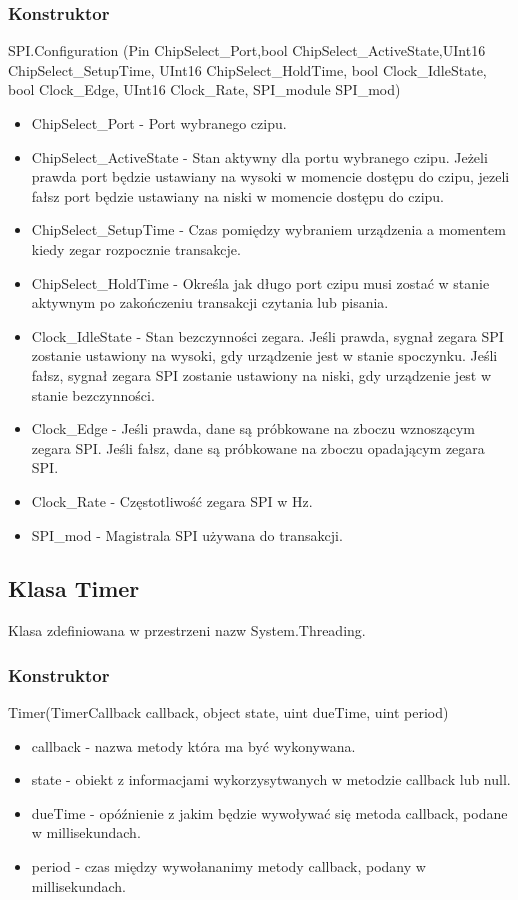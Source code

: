 \documentclass{article}
\begin{document}
\subsubsection{Konstruktor}
SPI.Configuration (Pin ChipSelect\_Port,bool ChipSelect\_ActiveState,\newline UInt16 ChipSelect\_SetupTime, UInt16 ChipSelect\_HoldTime,  bool Clock\_IdleState, bool Clock\_Edge, UInt16 Clock\_Rate, SPI\_module SPI\_mod)
\begin{itemize}
\item ChipSelect\_Port - Port wybranego czipu.
\item ChipSelect\_ActiveState - Stan aktywny dla portu wybranego czipu. Jeżeli prawda port będzie ustawiany na wysoki w momencie dostępu do czipu, jezeli fałsz port będzie ustawiany na niski w momencie dostępu do czipu.
\item ChipSelect\_SetupTime - Czas pomiędzy wybraniem urządzenia a momentem kiedy zegar rozpocznie transakcje. 
\item ChipSelect\_HoldTime - Określa jak długo port czipu musi zostać w stanie aktywnym po zakończeniu transakcji czytania lub pisania.
\item Clock\_IdleState - Stan bezczynności zegara. Jeśli prawda, sygnał zegara SPI zostanie ustawiony na wysoki, gdy urządzenie jest w stanie spoczynku. Jeśli fałsz, sygnał zegara SPI zostanie ustawiony na niski, gdy urządzenie jest w stanie bezczynności. 
\item Clock\_Edge - Jeśli prawda, dane są próbkowane na zboczu wznoszącym zegara SPI. Jeśli fałsz, dane są próbkowane na zboczu opadającym zegara SPI.
\item Clock\_Rate - Częstotliwość zegara SPI w Hz.
\item SPI\_mod - Magistrala SPI używana do transakcji.
\end{itemize}

\newpage
\subsection{Klasa Timer}
Klasa zdefiniowana w przestrzeni nazw System.Threading.
\subsubsection{Konstruktor}
Timer(TimerCallback callback, object state, uint dueTime, uint period)
\begin{itemize}
\item callback - nazwa metody która ma być wykonywana.
\item state - obiekt z informacjami wykorzysytwanych w metodzie callback lub null.
\item dueTime - opóźnienie z jakim będzie wywoływać się metoda callback, podane w millisekundach.
\item period - czas między wywołananimy metody callback, podany w millisekundach.
\end{itemize}
\end{document}
